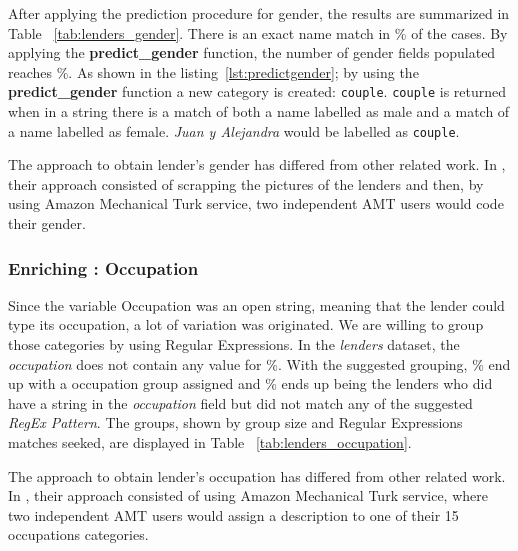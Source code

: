 After applying the prediction procedure for gender, the results are summarized in Table ~\ref{tab:lenders_gender}.
There is an exact name match in \% of the cases. By applying the \textbf{predict\_gender} function, the number of gender fields populated reaches \%. As shown in the listing~\ref{lst:predictgender}; by using the \textbf{predict\_gender} function a new category is created: \texttt{couple}. \texttt{couple} is returned when in a string there is a match of both a name labelled as male and a match of a name labelled as female. \textit{Juan y Alejandra} would be labelled as \texttt{couple}.


The approach to obtain lender's gender has differed from other related work. In \textcite{Galak2010}, their approach consisted of scrapping the pictures of the lenders and then, by using Amazon Mechanical Turk service, two independent AMT users would code their gender. 

\subsubsection{Enriching : Occupation}
Since the variable Occupation was an open string, meaning that the lender could type its occupation, a lot of variation was originated. We are willing to group those categories by using Regular Expressions. \newline
In the \textit{lenders} dataset, the \textit{occupation} does not contain any value for \%. With the suggested grouping, \% end up with a occupation group assigned and \% ends up being the lenders who did have a string in the \textit{occupation} field but did not match any of the suggested \textit{RegEx Pattern}. \newline
The groups, shown by group size and Regular Expressions matches seeked, are displayed in Table ~\ref{tab:lenders_occupation}.


The approach to obtain lender's occupation has differed from other related work. In \textcite{Galak2010}, their approach consisted of using Amazon Mechanical Turk service, where two independent AMT users would assign a description to one of their 15 occupations categories. 


